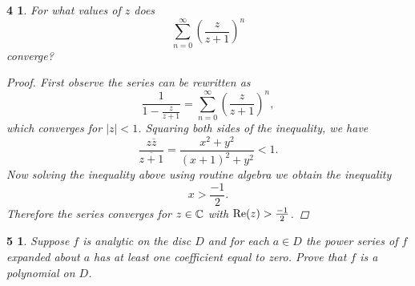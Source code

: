 \documentclass[10pt]{amsart}
\begin{document}
  \newtheorem*{4}{4}
  \begin{4}
    For what values of \(z\) does \[\sum\limits_{n=0}^{\infty} \left (\frac{z}{z+1} \right )^n\] converge?
    \begin{proof}
      First observe the series can be rewritten as \[\frac{1}{1 - \frac{z}{z+1}} = \sum_{n=0}^{\infty}\left(\frac{z}{z+1}\right)^n,\] which converges for \(\left|z\right| < 1\).
      Squaring both sides of the inequality, we have \[\frac{z\overline{z}}{\overline{z+1}} = \frac{x^2 + y^2}{(x+1)^2 + y^2} < 1.\]
      Now solving the inequality above using routine algebra we obtain the inequality \[x > \frac{-1}{2}.\]
      Therefore the series converges for \(z \in \mathbb{C}\) with \(\operatorname{Re}(z) > \frac{-1}{2}\).
    \end{proof}
  \end{4}

  \newtheorem*{5}{5}
  \begin{5}
    Suppose \(f\) is analytic on the disc \(D\) and for each \(a \in D\) the power series of \(f\) expanded about \(a\) has at least one coefficient equal to zero.  
    Prove that \(f\) is a polynomial on \(D\).  
  \end{5}
\end{document}
